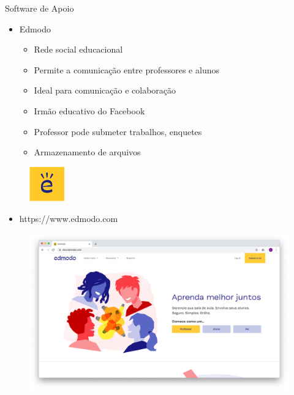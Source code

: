 \documentclass{beamer}
\begin{document}
\begin{frame}[allowframebreaks]{Software de Apoio}
    \begin{itemize}
        \item Edmodo
        \begin{itemize}
            \item Rede social educacional
            \item Permite a comunicação entre professores e alunos
            \item Ideal para comunicação e colaboração
            \item Irmão educativo do Facebook
            \item Professor pode submeter trabalhos, enquetes
            \item Armazenamento de arquivos
        \end{itemize}
    \end{itemize}
    \begin{figure}
        \includegraphics[width=1.5cm]{Theme/Logos/edmodo_logo.png}
    \end{figure}
    \framebreak
    \begin{itemize}
        \item https://www.edmodo.com
    \end{itemize}
    \begin{figure}
        \includegraphics[scale=0.17]{Theme/Logos/tela_inicial_edmodo.png}
    \end{figure}
    \framebreak


\end{frame}
\end{document}

